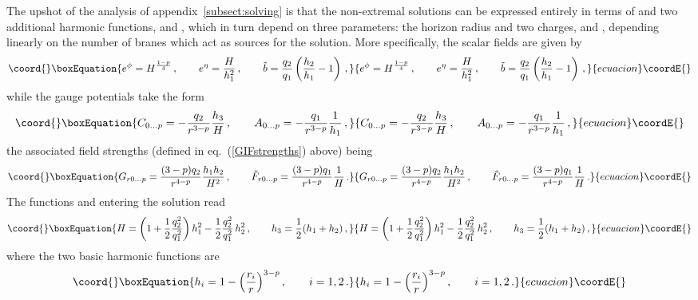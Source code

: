 \documentclass[a4paper,11pt]{article}
\providecommand{\eqref}[1]{(\ref{#1})}
\begin{document}
The upshot of the analysis of appendix~\ref{subsect:solving} is that
the non-extremal solutions can be expressed entirely in terms of \coordHE{}
and two additional harmonic functions, \coordHE{} and \coordHE{}, which in
turn depend on three parameters: the horizon radius \coordHE{} and two
charges, \coordHE{} and \coordHE{}, depending linearly on the number of branes
which act as sources for the  solution. More specifically, the scalar
fields are given by
%
\begin{equation}\coord{}\boxEquation{
\label{scal1}
e^\phi = H^{\frac{1-p}{4}} \spa e^\eta = \frac{H}{h_1^2} \spa \tilde b
= \frac{q_2}{q_1} \left(\frac{h_2}{h_1}-1\right) \,,
}{
e^\phi = H^{\frac{1-p}{4}} \spa e^\eta = \frac{H}{h_1^2} \spa \tilde b
= \frac{q_2}{q_1} \left(\frac{h_2}{h_1}-1\right) \,,
}{ecuacion}\coordE{}\end{equation}
while the gauge potentials take the form
\begin{equation}\coord{}\boxEquation{
\label{potsols}
C_{0\ldots p} = - \frac{q_2}{r^{3-p}} \frac{h_3}{H} \spa A_{0\ldots p}
= - \frac{q_1}{r^{3-p}} \frac{1} {h_1} \,,
}{
C_{0\ldots p} = - \frac{q_2}{r^{3-p}} \frac{h_3}{H} \spa A_{0\ldots p}
= - \frac{q_1}{r^{3-p}} \frac{1} {h_1} \,,
}{ecuacion}\coordE{}\end{equation}
the associated field strengths (defined in eq.~\eqref{GIFstrengths} above) 
being
\begin{equation}\coord{}\boxEquation{
\label{fstrengthsols}
G_{r0\ldots p} =  \frac{(3-p) q_2}{r^{4-p}} \frac{h_1 h_2}{H^2} \spa
\tilde{F}_{r0\ldots p} =  \frac{(3-p) q_1}{r^{4-p}} \frac{1}{H} \,.
}{
G_{r0\ldots p} =  \frac{(3-p) q_2}{r^{4-p}} \frac{h_1 h_2}{H^2} \spa
\tilde{F}_{r0\ldots p} =  \frac{(3-p) q_1}{r^{4-p}} \frac{1}{H} \,.
}{ecuacion}\coordE{}\end{equation}
The functions \coordHE{} and \coordHE{} entering the solution read
\begin{equation}\coord{}\boxEquation{
\label{Hh3defs}
H = \left( 1 + \frac{1}{2} \frac{q_2^2}{q_1^2} \right) h_1^2 -
\frac{1}{2} \frac{q_2^2}{q_1^2}\, h_2^2 \spa h_3 = \frac{1}{2} (h_1 +
h_2) \,,
}{
H = \left( 1 + \frac{1}{2} \frac{q_2^2}{q_1^2} \right) h_1^2 -
\frac{1}{2} \frac{q_2^2}{q_1^2}\, h_2^2 \spa h_3 = \frac{1}{2} (h_1 +
h_2) \,,
}{ecuacion}\coordE{}\end{equation}
where the two basic harmonic functions are
\begin{equation}\coord{}\boxEquation{
\label{accai}
h_i = 1 -\Big(\frac{r_i}{r}\Big)^{3-p} \spa i =1,2 \,.
}{
h_i = 1 -\Big(\frac{r_i}{r}\Big)^{3-p} \spa i =1,2 \,.
}{ecuacion}\coordE{}\end{equation}
\end{document}
